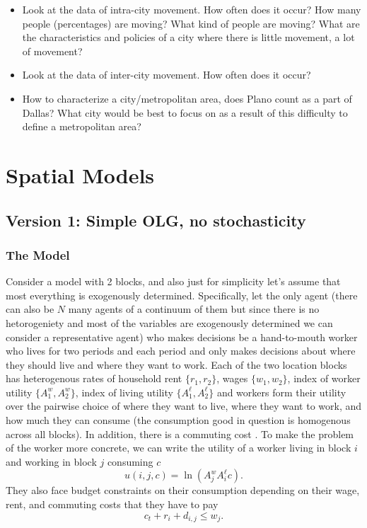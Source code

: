 \documentclass[11pt,english]{article}
\begin{document}
\begin{itemize}
\item Look at the data of intra-city movement. How often does it occur? How many people (percentages) are moving? What kind of people are moving? What are the characteristics and policies of a city where there is little movement, a lot of movement?

\item Look at the data of inter-city movement. How often does it occur?

\item How to characterize a city/metropolitan area, does Plano count as a part of Dallas? What city would be best to focus on as a result of this difficulty to define a metropolitan area?

\end{itemize}


\section{Spatial Models}

\subsection{Version 1: Simple OLG, no stochasticity}

\subsubsection{The Model}

Consider a model with 2 blocks, and also just for simplicity let's assume that most everything is exogenously determined. Specifically, let the only agent (there can also be $N$ many agents of a continuum of them but since there is no hetorogeniety and most of the variables are exogenously determined we can consider a representative agent) who makes decisions be a hand-to-mouth worker who lives for two periods and each period and only makes decisions about where they should live and where they want to work. Each of the two location blocks has heterogenous rates of household rent $\{r_1, r_2\}$, wages $\{w_1, w_2\}$, index of worker utility $\{A^w_1, A^w_2\}$, index of living utility $\{A^\ell_1, A^\ell_2\}$ and workers form their utility over the pairwise choice of where they want to live, where they want to work, and how much they can consume (the consumption good in question is homogenous across all blocks). In addition, there is a commuting cost . To make the problem of the worker more concrete, we can write the utility of a worker living in block $i$ and working in block $j$ consuming $c$ $$u(i,j, c) = \ln \left(A^w_jA^\ell_i c\right).$$ They also face budget constraints on their consumption depending on their wage, rent, and commuting costs that they have to pay $$c_t + r_i  + d_{i,j}\leq w_j.$$
\end{document}
